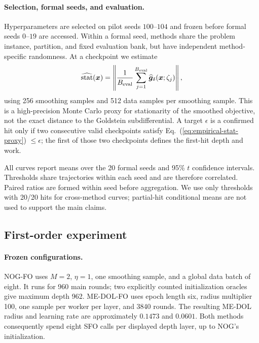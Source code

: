\paragraph{Selection, formal seeds, and evaluation.}
Hyperparameters are selected on pilot seeds $100$--$104$ and frozen before
formal seeds $0$--$19$ are accessed.  Within a formal seed, methods share the
problem instance, partition, and fixed evaluation bank, but have independent
method-specific randomness.  At a checkpoint we estimate
\begin{equation}\label{eq:empirical-stat-proxy}
 \widehat{\operatorname{stat}}({\bm{x}})
 =\left\|\frac{1}{B_{\rm eval}}\sum_{j=1}^{B_{\rm eval}}
 \widehat{{\bm{g}}}_{\delta}({\bm{x}};\zeta_j)\right\|,
\end{equation}
using 256 smoothing samples and 512 data samples per smoothing sample.  This
is a high-precision Monte Carlo proxy for stationarity of the smoothed
objective, not the exact distance to the Goldstein subdifferential.  A target
$\epsilon$ is a confirmed hit only if two consecutive valid checkpoints
satisfy Eq.~(\ref{eq:empirical-stat-proxy}) $\leq\epsilon$; the first of those
two checkpoints defines the first-hit depth and work.

All curves report means over the 20 formal seeds and 95\% $t$ confidence
intervals.  Thresholds share trajectories within each seed and are therefore
correlated.  Paired ratios are formed within seed before aggregation.  We use
only thresholds with 20/20 hits for cross-method curves; partial-hit
conditional means are not used to support the main claims.

\subsection{First-order experiment}\label{app:fo-experiments}

\paragraph{Frozen configurations.}
NOG-FO uses $M=2$, $\eta=1$, one smoothing sample, and a global data batch of
eight.  It runs for 960 main rounds; two explicitly counted initialization
oracles give maximum depth 962.  ME-DOL-FO uses epoch length six, radius
multiplier 100, one sample per worker per layer, and 3840 rounds.  The
resulting ME-DOL radius and learning rate are approximately $0.1473$ and
$0.0601$.  Both methods consequently spend eight SFO calls per displayed
depth layer, up to NOG's initialization.

